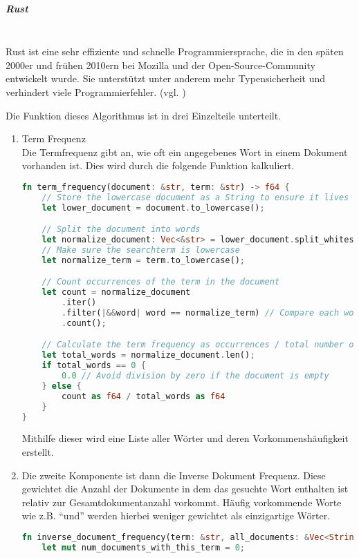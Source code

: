 \subparagraph{Rust}\mbox{}\\
Rust ist eine sehr effiziente und schnelle Programmiersprache, die in den späten 2000er und frühen 2010ern bei Mozilla und der Open-Source-Community entwickelt wurde. Sie unterstützt unter anderem mehr Typensicherheit und verhindert viele Programmierfehler. (vgl. \cite{gpt_rust})

Die Funktion dieses Algorithmus ist in drei Einzelteile unterteilt.

\begin{enumerate}
    \item Term Frequenz \\
    Die Termfrequenz gibt an, wie oft ein angegebenes Wort in einem Dokument vorhanden ist. Dies wird durch die folgende Funktion kalkuliert.
    
    \begin{lstlisting}[language=Rust, caption={Berechnung der Termfrequenz}]
fn term_frequency(document: &str, term: &str) -> f64 {
    // Store the lowercase document as a String to ensure it lives long enough
    let lower_document = document.to_lowercase(); 

    // Split the document into words
    let normalize_document: Vec<&str> = lower_document.split_whitespace().collect();
    // Make sure the searchterm is lowercase
    let normalize_term = term.to_lowercase();

    // Count occurrences of the term in the document
    let count = normalize_document
        .iter()
        .filter(|&&word| word == normalize_term) // Compare each word with the term
        .count();

    // Calculate the term frequency as occurrences / total number of words
    let total_words = normalize_document.len();
    if total_words == 0 {
        0.0 // Avoid division by zero if the document is empty
    } else {
        count as f64 / total_words as f64
    }
}\end{lstlisting}

    Mithilfe dieser wird eine Liste aller Wörter und deren Vorkommenshäufigkeit erstellt.

    \item Die zweite Komponente ist dann die Inverse Dokument Frequenz. Diese gewichtet die Anzahl der Dokumente in dem das gesuchte Wort enthalten ist relativ zur Gesamtdokumentanzahl vorkommt. Häufig vorkommende Worte wie z.B. \enquote{und} werden hierbei weniger gewichtet als einzigartige Wörter.

\begin{lstlisting}[language=Rust, caption={Berechnung der Inversen Dokumentenfrequenz}]
fn inverse_document_frequency(term: &str, all_documents: &Vec<String>) -> f64 {
    let mut num_documents_with_this_term = 0;


\end{lstlisting}
\end{enumerate}

